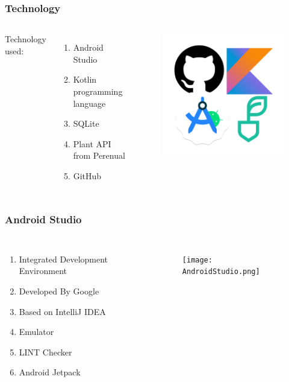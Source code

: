 \documentclass[xcolor=table]{beamer}
\begin{document}
\begin{frame}[fragile]
\frametitle{Technology}
\begin{columns}
Technology used:
\bigskip
   \begin{enumerate}
    \item Android Studio
    \bigskip
    \item Kotlin programming language
    \bigskip
    \item SQLite
    \bigskip
    \item Plant API from Perenual
    \bigskip
    \item GitHub
  \end{enumerate}
    \begin{figure}[H]
    \includegraphics[width = .8\linewidth]{technologies.png}
    \end{figure}
    \end{columns}
\end{frame}

\begin{frame}[fragile]
\frametitle{Android Studio}
\begin{columns}
   \begin{enumerate}
    \item Integrated Development Environment
    \bigskip
    \item Developed By Google
    \bigskip
    \item Based on IntelliJ IDEA
    \bigskip
    \item Emulator
    \bigskip
    \item LINT Checker
    \bigskip
    \item Android Jetpack
  \end{enumerate}
    \begin{figure}[H]
    \texttt{[image: AndroidStudio.png]}
    \end{figure}
    \end{columns}
\end{frame}
\end{document}
